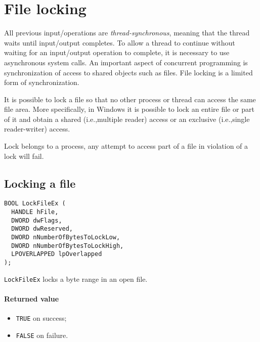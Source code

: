 \section{File locking}
All previous input/operations are \emph{thread-synchronous}, meaning that the thread waits until input/output completes. To allow a thread to continue without waiting for an input/output operation to complete, it is necessary to use asynchronous system calls. An important aspect of concurrent programming is synchronization of access to shared objects such as files. File locking is a limited form of synchronization.

It is possible to lock a file so that no other process or thread can access the same file area. More specifically, in Windows it is possible to lock an entire file or part of it and obtain a shared (i.e.,\@ multiple reader) access or an exclusive (i.e.,\@ single reader-writer) access.

Lock belongs to a process, any attempt to access part of a file in violation of a lock will fail.

\subsection{Locking a file}
\begin{verbatim}
BOOL LockFileEx (
  HANDLE hFile,
  DWORD dwFlags,
  DWORD dwReserved,
  DWORD nNumberOfBytesToLockLow,
  DWORD nNumberOfBytesToLockHigh,
  LPOVERLAPPED lpOverlapped
);
\end{verbatim}

\texttt{LockFileEx} locks a byte range in an open file.

\paragraph{Returned value}
\begin{itemize}
\item \texttt{TRUE} on success;
\item \texttt{FALSE} on failure.
\end{itemize}

